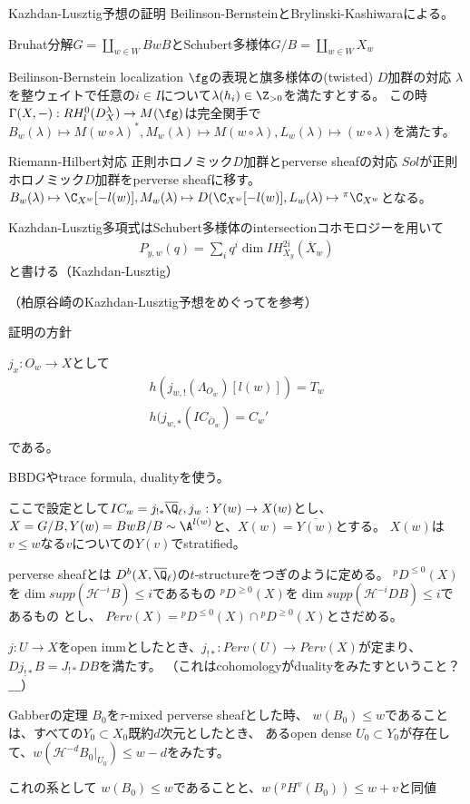 \documentclass[dvipdfmx]{beamer}
\begin{document}
\begin{frame}{Kazhdan-Lusztig予想の証明}
Beilinson-BernsteinとBrylinski-Kashiwaraによる。

Bruhat分解$G=\coprod_{w\in W}BwB$とSchubert多様体$G/B=\coprod_{w\in W}X_w$

Beilinson-Bernstein localization
$\fg$の表現と旗多様体の(twisted) $D$加群の対応
$\lambda$を整ウェイトで任意の$i\in I$について$\lambda(h_i)\in\Z_{>0}$を満たすとする。
この時$\Gamma(X,-):RH^0_l(D^\lambda_X) \to M(\fg)$は完全関手で
$B_w(\lambda)\mapsto M(w\circ\lambda)^*, M_w(\lambda)\mapsto M(w\circ\lambda), L_w(\lambda)\mapsto(w\circ\lambda)$を満たす。

Riemann-Hilbert対応
正則ホロノミック$D$加群とperverse sheafの対応
$Sol$が正則ホロノミック$D$加群をperverse sheafに移す。
$B_w(\lambda)\mapsto \C_{X^w}[-l(w)], M_w(\lambda)\mapsto D(\C_{X^w}[-l(w)],L_w(\lambda)\mapsto {}^\pi\C_{X^w}$となる。

Kazhdan-Lusztig多項式はSchubert多様体のintersectionコホモロジーを用いて
\begin{align*}
P_{y,w}(q)=\sum_iq^i\dim IH_{X_y}^{2i}(\overline{X}_w)
\end{align*}
と書ける（Kazhdan-Lusztig）

（柏原谷崎のKazhdan-Lusztig予想をめぐってを参考）
\end{frame}

\begin{frame}
証明の方針

$j_x:O_w\to X$として
\begin{align*}
h(j_{w,!}(\Lambda_{O_w})[l(w)])=T_w\\
h(j_{w,*}(IC_{\bar{O}_w})=C_w'\\
\end{align*}
である。

BBDGやtrace formula, dualityを使う。

ここで設定として$IC_w=j_{!*}\overline{\Q}_\ell, j_w:Y(w)\to X(w)$とし、
$X=G/B, Y(w)=BwB/B \sim \A^{l(w)}$と、$X(w)=\overline{Y(w)}$とする。
$X(w)$は$v\leq w$なる$v$についての$Y(v)$でstratified。
\end{frame}

\begin{frame}{perverse sheafとは}
$D^b(X,\overline{\Q}_\ell)$の$t$-structureをつぎのように定める。
${}^pD^{\leq0}(X)$を$\dim supp(\mathcal{H}^{-i}B)\leq i$であるもの
${}^pD^{\geq0}(X)$を$\dim supp(\mathcal{H}^{-i}DB)\leq i$であるもの
とし、
$Perv(X)={}^pD^{\leq0}(X)\cap{}^pD^{\geq0}(X)$とさだめる。

$j:U \to X$をopen immとしたとき、$j_{!*}:Perv(U) \to Perv(X)$が定まり、
$Dj_{!*}B=J_{!*}DB$を満たす。
（これはcohomologyがdualityをみたすということ？＿）

Gabberの定理
$B_0$を$\tau$-mixed perverse sheafとした時、
$w(B_0)\leq w$であることは、すべての$Y_0\subset X_0$既約$d$次元としたとき、
あるopen dense $U_0\subset Y_0$が存在して、$w(\mathcal{H}^{-d}B_0\vert_{U_0})\leq w-d$をみたす。

これの系として
$w(B_0)\leq w$であることと、$w({}^pH^v(B_0))\leq w+v$と同値
\end{frame}
\end{document}
